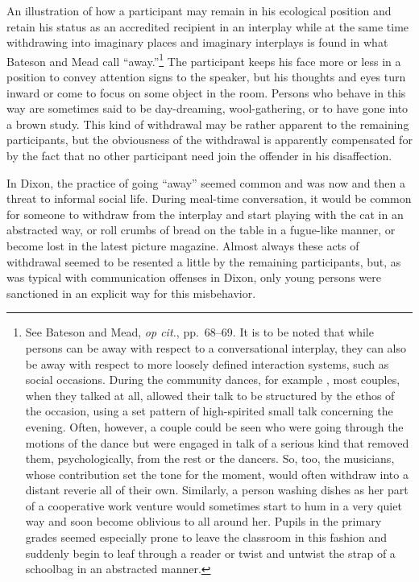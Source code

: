 \documentclass[openany,nobib]{tufte-book}
\begin{document}
An illustration of how a participant may remain in his ecological
position and retain his status as an accredited recipient in an
interplay while at the same time withdrawing into imaginary places and
imaginary interplays is found in what Bateson and Mead call
``away.''\footnote{See Bateson and Mead, \emph{op cit.}, pp.~68--69. It
  is to be noted that while persons can be away with respect to a
  conversational interplay, they can also be away with respect to more
  loosely defined interaction systems, such as social occasions. During
  the community dances, for example , most couples, when they talked at
  all, allowed their talk to be structured by the ethos of the occasion,
  using a set pattern of high-spirited small talk concerning the
  evening. Often, however, a couple could be seen who were going through
  the motions of the dance but were engaged in talk of a serious kind
  that removed them, psychologically, from the rest or the dancers. So,
  too, the musicians, whose contribution set the tone for the moment,
  would often withdraw into a distant reverie all of their own.
  Similarly, a person washing dishes as her part of a cooperative work
  venture would sometimes start to hum in a very quiet way and soon
  become oblivious to all around her. Pupils in the primary grades
  seemed especially prone to leave the classroom in this fashion and
  suddenly begin to leaf through a reader or twist and untwist the strap
  of a schoolbag in an abstracted manner.} The participant keeps his
face more or less in a position to convey attention signs to the
speaker, but his thoughts and eyes turn inward or come to focus on some
object in the room. Persons who behave in this way are sometimes said to
be day-dreaming, wool-gathering, or to have gone into a brown study.
This kind of withdrawal may be rather apparent to the remaining
participants, but the obviousness of the withdrawal is apparently
compensated for by the fact that no other participant need join the
offender in his disaffection.

In Dixon, the practice of going ``away'' seemed common and was now and
then a threat to informal social life. During meal-time conversation, it
would be common for someone to withdraw from the interplay and start
playing with the cat in an abstracted way, or roll crumbs of bread on
the table in a fugue-like manner, or become lost in the latest picture
magazine. Almost always these acts of withdrawal seemed to be resented a
little by the remaining participants, but, as was typical with
communication offenses in Dixon, only young persons were sanctioned in
an explicit way for this misbehavior.
\end{document}
